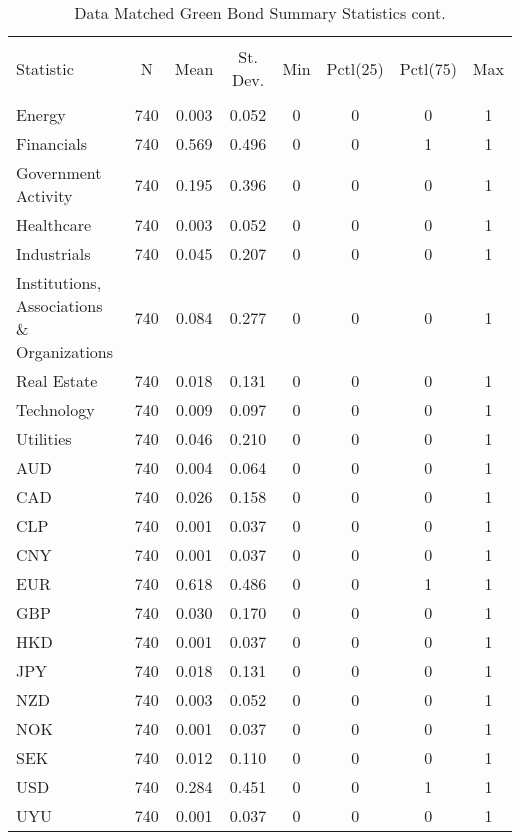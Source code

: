 \begin{table}[!htbp] \centering 
  \footnotesize
  \caption{Data Matched Green Bond Summary Statistics cont.} 
  \label{} 
\begin{tabular}{@{\extracolsep{5pt}}lccccccc} 
\\[-1.8ex]\hline 
\hline \\[-1.8ex] 
Statistic & \multicolumn{1}{c}{N} & \multicolumn{1}{c}{Mean} & \multicolumn{1}{c}{St. Dev.} & \multicolumn{1}{c}{Min} & \multicolumn{1}{c}{Pctl(25)} & \multicolumn{1}{c}{Pctl(75)} & \multicolumn{1}{c}{Max} \\ 
\hline \\[-1.8ex] 
Energy & 740 & 0.003 & 0.052 & 0 & 0 & 0 & 1 \\ 
Financials & 740 & 0.569 & 0.496 & 0 & 0 & 1 & 1 \\ 
Government Activity & 740 & 0.195 & 0.396 & 0 & 0 & 0 & 1 \\ 
Healthcare & 740 & 0.003 & 0.052 & 0 & 0 & 0 & 1 \\ 
Industrials & 740 & 0.045 & 0.207 & 0 & 0 & 0 & 1 \\ 
Institutions, Associations \& Organizations & 740 & 0.084 & 0.277 & 0 & 0 & 0 & 1 \\ 
Real Estate & 740 & 0.018 & 0.131 & 0 & 0 & 0 & 1 \\ 
Technology & 740 & 0.009 & 0.097 & 0 & 0 & 0 & 1 \\ 
Utilities & 740 & 0.046 & 0.210 & 0 & 0 & 0 & 1 \\ 
AUD & 740 & 0.004 & 0.064 & 0 & 0 & 0 & 1 \\ 
CAD & 740 & 0.026 & 0.158 & 0 & 0 & 0 & 1 \\ 
CLP & 740 & 0.001 & 0.037 & 0 & 0 & 0 & 1 \\ 
CNY & 740 & 0.001 & 0.037 & 0 & 0 & 0 & 1 \\ 
EUR & 740 & 0.618 & 0.486 & 0 & 0 & 1 & 1 \\ 
GBP & 740 & 0.030 & 0.170 & 0 & 0 & 0 & 1 \\ 
HKD & 740 & 0.001 & 0.037 & 0 & 0 & 0 & 1 \\ 
JPY & 740 & 0.018 & 0.131 & 0 & 0 & 0 & 1 \\ 
NZD & 740 & 0.003 & 0.052 & 0 & 0 & 0 & 1 \\ 
NOK & 740 & 0.001 & 0.037 & 0 & 0 & 0 & 1 \\ 
SEK & 740 & 0.012 & 0.110 & 0 & 0 & 0 & 1 \\ 
USD & 740 & 0.284 & 0.451 & 0 & 0 & 1 & 1 \\ 
UYU & 740 & 0.001 & 0.037 & 0 & 0 & 0 & 1 \\ 

\end{tabular}
\end{table}
